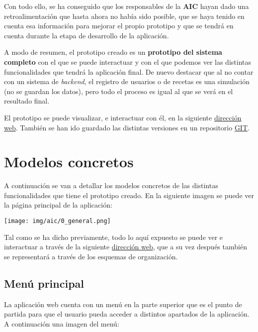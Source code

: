 \documentclass{\ClassPath/viu-tfm-template}
\begin{document}
Con todo ello, se ha conseguido que los responsables de la \textbf{AIC} hayan dado una retroalimentación que hasta ahora no había sido posible, que se haya tenido en cuenta esa información para mejorar el propio prototipo y que se tendrá en cuenta durante la etapa de desarrollo de la aplicación.

A modo de resumen, el prototipo creado es un \textbf{prototipo del sistema completo} con el que se puede interactuar y con el que podemos ver las distintas funcionalidades que tendrá la aplicación final. De nuevo destacar que al no contar con un sistema de \textit{backend}, el registro de usuarios o de recetas es una simulación (no se guardan los datos), pero todo el proceso es igual al que se verá en el resultado final.

El prototipo se puede visualizar, e interactuar con él, en la siguiente  \href{https://yuki.github.io/VIU_03MASW/preview.html}{dirección web}. También se han ido guardado las distintas versiones en un repositorio \href{https://github.com/yuki/VIU_03MASW}{GIT}.


\chapter{Modelos concretos}

A continuación se van a detallar los modelos concretos de las distintas funcionalidades que tiene el prototipo creado. En la siguiente imagen se puede ver la página principal de la aplicación:

\begin{center}
    \vspace{-0.5em}
    \texttt{[image: img/aic/0\_general.png]}
    \vspace{-20pt}
\end{center}

Tal como se ha dicho previamente, todo lo aquí expuesto se puede ver e interactuar a través de la siguiente \href{https://yuki.github.io/VIU_03MASW/preview.html}{dirección web}, que a su vez después también se representará a través de los esquemas de organización.

\hypertarget{menu_principal}{}
\section{Menú principal}

La aplicación web cuenta con un menú en la parte superior que es el punto de partida para que el usuario pueda acceder a distintos apartados de la aplicación. A continuación una imagen del menú:
\end{document}
